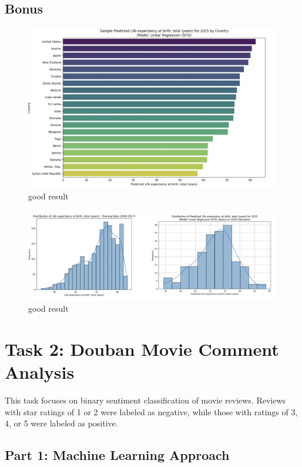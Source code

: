 \documentclass{article}
\begin{document}
\subsection*{Bonus}

\begin{figure}[h]
    \centering
    \includegraphics[width=0.8\columnwidth]{./pic/T1.bonus.1.png} %
    \caption{good result}
    \label{fig:correlation_heatmap}
\end{figure}

\begin{figure}[h]
    \centering
    \includegraphics[width=0.8\columnwidth]{./pic/T1.bonus.2.png} %
    \caption{good result}
    \label{fig:correlation_heatmap}
\end{figure}


\section{Task 2: Douban Movie Comment Analysis}
\label{sec:task2}

This task focuses on binary sentiment classification of movie reviews. Reviews with star ratings of 1 or 2 were labeled as negative, while those with ratings of 3, 4, or 5 were labeled as positive.

\subsection{Part 1: Machine Learning Approach}
\label{ssec:ml_approach}
\end{document}
